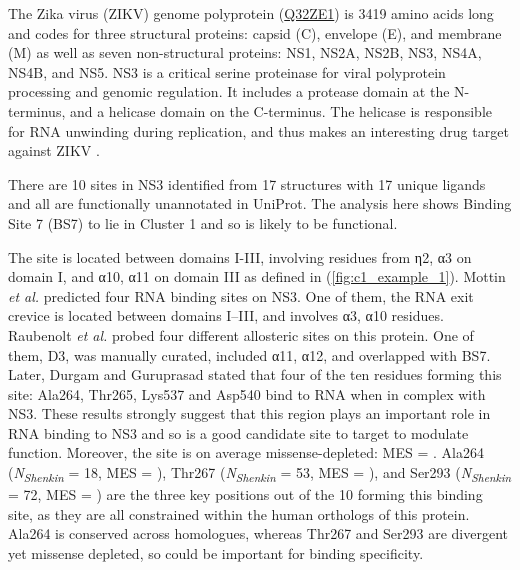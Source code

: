 The Zika virus (ZIKV) genome polyprotein (\href{https://www.uniprot.org/uniprotkb/Q32ZE1/entry}{Q32ZE1}) is 3419 amino acids long and codes for three structural proteins: capsid (C), envelope (E), and membrane (M) as well as seven non-structural proteins: NS1, NS2A, NS2B, NS3, NS4A, NS4B, and NS5. NS3 is a critical serine proteinase for viral polyprotein processing and genomic regulation. It includes a protease domain at the N-terminus, and a helicase domain on the C-terminus. The helicase is responsible for RNA unwinding during replication, and thus makes an interesting drug target against ZIKV \cite{LUO_2015_FLAVIVIRUS}.

There are 10 sites in NS3 identified from 17 structures with 17 unique ligands and all are functionally unannotated in UniProt. The analysis here shows Binding Site 7 (BS7) to lie in Cluster 1 and so is likely to be functional.

The site is located between domains I-III, involving residues from η2, α3 on domain I, and α10, α11 on domain III as defined in \cite{TIAN_2016_ZIKV} (\autoref{fig:c1_example_1}). Mottin \textit{et al.} \cite{MOTTIN_2017_ZIKA_HELICASE} predicted four RNA binding sites on NS3. One of them, the RNA exit crevice is located between domains I–III, and involves α3, α10 residues. Raubenolt \textit{et al.} \cite{RAUBENOLT_2021_ZIKA_ALLOSTERIC} probed four different allosteric sites on this protein. One of them, D3, was manually curated, included α11, α12, and overlapped with BS7. Later, Durgam and Guruprasad \cite{DURGAM_2022_ZIKA_ATP} stated that four of the ten residues forming this site: Ala264, Thr265, Lys537 and Asp540 bind to RNA when in complex with NS3. These results strongly suggest that this region plays an important role in RNA binding to NS3 and so is a good candidate site to target to modulate function. Moreover, the site is on average missense-depleted: MES =  . Ala264 (\textit{N\textsubscript{Shenkin}} = 18, MES = ), Thr267 (\textit{N\textsubscript{Shenkin}} = 53, MES = ), and Ser293 (\textit{N\textsubscript{Shenkin}} = 72, MES =  ) are the three key positions out of the 10 forming this binding site, as they are all constrained within the human orthologs of this protein. Ala264 is conserved across homologues, whereas Thr267 and Ser293 are divergent yet missense depleted, so could be important for binding specificity.

